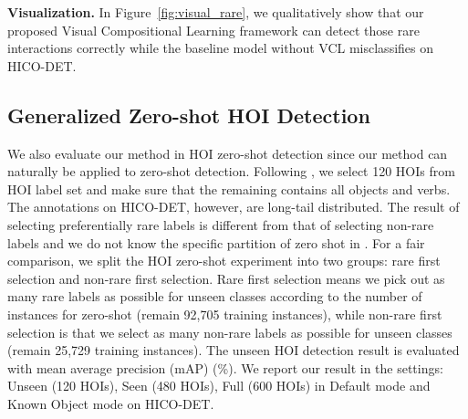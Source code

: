\documentclass[runningheads]{llncs}
\begin{document}
{\bf Visualization.} In Figure~\ref{fig:visual_rare}, we qualitatively show that our proposed Visual Compositional Learning framework can detect those rare interactions correctly
while the baseline model without VCL misclassifies on HICO-DET.


\subsection{Generalized Zero-shot HOI Detection}
We also evaluate our method in HOI zero-shot detection since our method can naturally be applied to zero-shot detection.
Following \cite{shen2018scaling}, we select 120 HOIs from HOI label set and make sure that the remaining contains all objects and verbs.
The annotations on HICO-DET, however, are long-tail distributed.
The result of selecting preferentially rare labels is different from that of selecting non-rare labels
and we do not know the specific partition of zero shot in \cite{shen2018scaling, bansal2019detecting}.
For a fair comparison, we split the HOI zero-shot experiment into two groups: rare first selection and non-rare first selection.
Rare first selection means we pick out as many rare labels as possible for unseen classes according to the number of instances for zero-shot (remain 92,705 training instances), while non-rare first selection is that we select as many non-rare labels as possible for unseen classes (remain 25,729 training instances). The unseen HOI detection result is evaluated with mean average precision (mAP) (\%). We report our result in the settings: Unseen (120 HOIs), Seen (480 HOIs), Full (600 HOIs) in Default mode and Known Object mode on HICO-DET.
\end{document}
